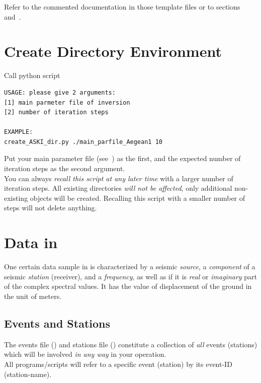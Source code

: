 Refer to the commented documentation in those template files or 
to sections~ and~.
%
\section{Create Directory Environment} \label{basic_steps,sec:create_dir}
%
Call python script 
\begin{lstlisting}
USAGE: please give 2 arguments:
[1] main parmeter file of inversion
[2] number of iteration steps

EXAMPLE:
create_ASKI_dir.py ./main_parfile_Aegean1 10
\end{lstlisting}
Put your main parameter file (see~) as the first, and the expected 
number of iteration steps as the second argument. \\
You can always \emph{recall this script at any later time} with a larger number of iteration steps. 
All existing directories \emph{will not be affected}, only additional non-existing objects will be 
created. Recalling this script with a smaller number of steps will not delete anything.
%
\section{Data in \ASKI} \label{basic_steps,sec:data_general}
%
One certain data sample in \ASKI{} is characterized by a seismic \emph{source}, a \emph{component} 
of a seismic \emph{station} (receiver), and a \emph{frequency}, as well as if it is \emph{real} or \emph{imaginary} part 
of the complex spectral values. It has the value of displacement of the ground in the unit of meters.
%
\subsection*{Events and Stations}
%
The events file () and stations file () constitute a
collection of \emph{all} events (stations) which will be involved \emph{in any way} in your \ASKI{} operation.\\
All programs/scripts will refer to a specific event (station) by its event-ID (station-name).
%
